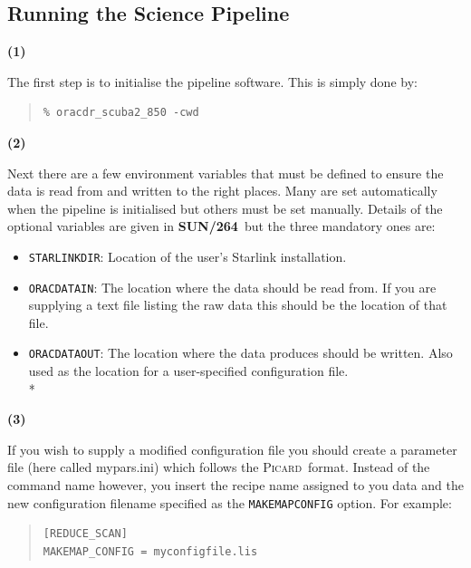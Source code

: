 \documentclass[twoside,11pt]{article}
\newcommand{\xref}[3]{#1}
\newcommand{\xlabel}[1]{}
\renewcommand{\_}{\texttt{\symbol{95}}}
\newenvironment{myquote}{\begin{quote}\begin{small}}{\end{small}\end{quote}}
\newcommand{\picard}{\xref{\textsc{Picard}}{sun231}{}}
\newcommand{\param}[1]{\texttt{#1}}
\newcommand{\pipelinesun}{\xref{\textbf{SUN/264}}{sun264}{}}
\begin{document}
\subsection{\xlabel{running_pl}Running the Science Pipeline}
\begin{minipage}[t]{0.05\linewidth}
\textbf{(1)}
\end{minipage}
\begin{minipage}[t]{0.95\linewidth}
The first step is to initialise the pipeline software. This is simply done by:
 \begin{myquote}
\begin{verbatim}
% oracdr_scuba2_850 -cwd

\end{verbatim}
\end{myquote}
\end{minipage}

\begin{minipage}[t]{0.05\linewidth}
\textbf{(2)}
\end{minipage}
\begin{minipage}[t]{0.95\linewidth}
Next there are a few  environment variables that must be defined to ensure the data is read from and written to the right places. Many are set automatically when the pipeline is initialised but others must be set manually. Details of the optional variables are given in  \pipelinesun\ but the three mandatory ones are:
\begin{itemize}\itemsep-0.1em
\item \param{STARLINK\_DIR}: Location of the user's Starlink installation.
\item \param{ORAC\_DATA\_IN}: The location where the data should be read from. If you are supplying a text file listing the raw data this should be the location of that file.
\item \param{ORAC\_DATA\_OUT}: The location where the data produces should be written. Also used as the location for a user-specified configuration file.\\*
\end{itemize}
\end{minipage}

\begin{minipage}[t]{0.05\linewidth}
\textbf{(3)}
\end{minipage}
\begin{minipage}[t]{0.95\linewidth}
If you wish to supply a modified configuration file you should create a parameter file (here called mypars.ini)  which follows the \picard\ format. Instead of the command name however, you insert the recipe name assigned to you data and the new configuration filename specified as the \texttt{MAKEMAP\_CONFIG} option. For example:
 \begin{myquote}
\begin{verbatim}
[REDUCE_SCAN]
MAKEMAP_CONFIG = myconfigfile.lis
 \end{verbatim}
\end{myquote}
\end{minipage}
\end{document}
